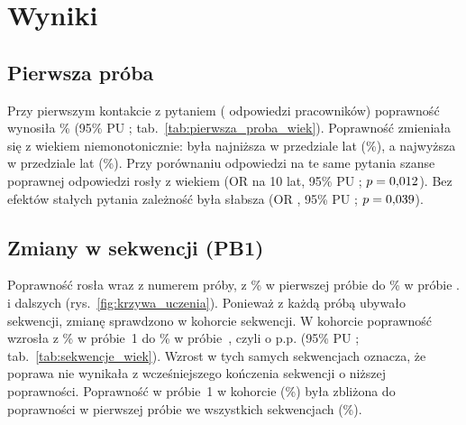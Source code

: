 \section{Wyniki}

\subsection{Pierwsza próba}
Przy pierwszym kontakcie z pytaniem (\FirstN{} odpowiedzi \NEmployees{} pracowników) poprawność
wynosiła \FirstAcc\% (95\% PU \FirstAccCI; tab.~\ref{tab:pierwsza_proba_wiek}). Poprawność
zmieniała się z wiekiem niemonotonicznie: była najniższa w przedziale \FirstAccMinGroup{} lat
(\FirstAccMin\%), a najwyższa w przedziale \FirstAccMaxGroup{} lat (\FirstAccMax\%). Przy porównaniu
odpowiedzi na te same pytania szanse poprawnej odpowiedzi rosły z wiekiem (OR \FirstAgeOR{} na 10 lat,
95\% PU \FirstAgeORCI; $p = 0{,}012$). Bez efektów stałych pytania zależność była słabsza
(OR \FirstAgeRawOR, 95\% PU \FirstAgeRawORCI; $p = 0{,}039$).

\begin{table}[H]
\centering
\caption{Poprawność w pierwszej próbie ogółem i według przedziału wieku pracownika.}
\label{tab:pierwsza_proba_wiek}
\footnotesize
\setlength{\tabcolsep}{4pt}
\end{table}

\subsection{Zmiany w sekwencji (PB1)}
Poprawność rosła wraz z numerem próby, z \AccAttOne\% \AccAttOneCI{} w pierwszej próbie do
\AccAttMax\% \AccAttMaxCI{} w próbie \AttMax{}. i dalszych (rys.~\ref{fig:krzywa_uczenia}). Ponieważ
z każdą próbą ubywało sekwencji, zmianę sprawdzono w kohorcie \CohortN{} sekwencji. W kohorcie
poprawność wzrosła z \CohortAccOne\% \CohortAccOneCI{} w próbie~1 do \CohortAccK\% \CohortAccKCI{}
w próbie~\CohortK{}, czyli o \SeqChange{} p.p. (95\% PU \SeqChangeCI; tab.~\ref{tab:sekwencje_wiek}).
Wzrost w tych samych sekwencjach oznacza, że poprawa nie wynikała z wcześniejszego kończenia sekwencji
o niższej poprawności. Poprawność w próbie~1 w kohorcie (\CohortAccOne\%) była zbliżona do
poprawności w pierwszej próbie we wszystkich sekwencjach (\FirstAcc\%).

